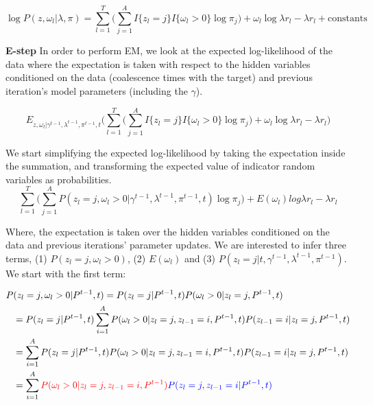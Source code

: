 \begin{equation}
    \log P(z, \omega_l \vert \lambda, \pi) = \sum\limits_{l=1}^{T} \Big( \sum\limits_{j=1}^{A} I\{z_l = j\} I\{\omega_l > 0\} \log \pi_j \Big) + \omega_l \log \lambda r_l - \lambda r_l + \text{constants}
\end{equation}

\textbf{E-step}
\label{sec:term2_estep}
In order to perform EM, we look at the expected log-likelihood of the data where the expectation is taken with respect to the hidden variables conditioned on the data (coalescence times with the target) and previous iteration's model parameters (including the $\gamma$).

\begin{equation}
    E_{z, \omega_l \vert \gamma^{t-1}, \lambda^{t-1}, \pi^{t-1}, t}\Big( \sum\limits_{l=1}^{T} \Big( \sum\limits_{j=1}^{A} I\{z_l = j\} I\{\omega_l > 0\} \log \pi_j \Big) + \omega_l \log \lambda r_l - \lambda r_l \Big)
\end{equation}

We start simplifying the expected log-likelihood by taking the expectation inside the summation, and transforming the expected value of indicator random variables as probabilities. 
\begin{equation}
     \sum\limits_{l=1}^{T} \Big( \sum\limits_{j=1}^{A} P(z_l = j, \omega_l > 0 \vert \gamma^{t-1}, \lambda^{t-1}, \pi^{t-1}, t) \log \pi_j \Big) + E(\omega_l) log \lambda r_l - \lambda r_l
\end{equation}

Where, the expectation is taken over the hidden variables conditioned on the data and previous iterations' parameter updates. We are interested to infer three terms, (1) $P(z_l = j, \omega_l > 0)$, (2) $E(\omega_l)$ and (3) $P(z_l = j | t, \gamma^{t-1}, \lambda^{t-1}, \pi^{t-1})$. We start with the first term:

\begin{align}
    P&(z_l = j, \omega_l > 0 \vert P^{t-1}, t) = P(z_l = j \vert P^{t-1}, t) P(\omega_l > 0 \vert z_l = j, P^{t-1}, t) \nonumber \\
    &= P(z_l = j \vert P^{t-1}, t) \sum\limits_{i=1}^{A} P(\omega_l > 0 \vert z_l = j, z_{l-1} = i, P^{t-1}, t) P(z_{l-1} = i \vert z_l = j, P^{t-1}, t) \nonumber \\
    &= \sum\limits_{i=1}^{A} P(z_l = j \vert P^{t-1}, t) P(\omega_l > 0 \vert z_l = j, z_{l-1} = i, P^{t-1}, t) P(z_{l-1} = i \vert z_l = j, P^{t-1}, t) \nonumber \\
    &= \sum\limits_{i=1}^{A} \color{red}{P(\omega_l > 0 \vert z_l = j, z_{l-1} = i, P^{t-1})} \color{blue}{P(z_l = j, z_{l-1} = i \vert P^{t-1}, t)}
\label{eq:hmm_estep}
\end{align}

